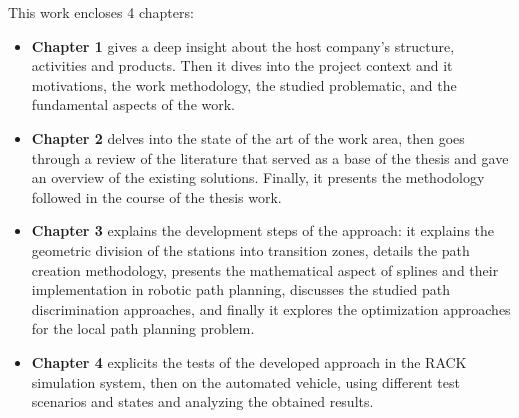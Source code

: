 \noindent This work encloses 4 chapters: 
\begin{itemize}
    \item \textbf{Chapter 1} gives a deep insight about the host company’s structure, activities and products. 
    Then it dives into the project context and it motivations, the work methodology, the studied problematic, and
    the fundamental aspects of the work.
    \item \textbf{Chapter 2} delves into the state of the art of the work area, then goes through a review of the 
    literature that served as a base of the thesis and gave an overview of the existing solutions. Finally, 
    it presents the methodology followed in the course of the thesis work. 
    \item \textbf{Chapter 3} explains the development steps of the approach: it explains the geometric division of 
    the stations into transition zones, details the path creation methodology, presents the mathematical aspect of 
    splines and their implementation in robotic path planning, discusses the studied path discrimination approaches, 
    and finally it explores the optimization approaches for the local path planning problem. 
    \item \textbf{Chapter 4} explicits the tests of the developed approach in the RACK simulation system, then 
    on the automated vehicle, using different test scenarios and states and analyzing the obtained results. 
\end{itemize}

\newpage
\thispagestyle{intro}
